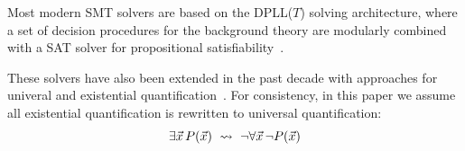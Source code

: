 \documentclass[oribibl]{llncs}
\begin{document}
Most modern SMT solvers are based on the DPLL($T$) solving architecture,
where a set of decision procedures for the background theory are modularly combined with a SAT solver for propositional satisfiability~\cite{nieuwenhuis2006solving}.

These solvers have also been extended 
in the past decade with approaches for univeral and existential quantification~\cite{Detlefs03simplify:a,MouraBjoerner07,GeBarrettTinelli07}.
For consistency, in this paper we assume all existential quantification is rewritten to universal quantification:
\[
\exists \vec x\, P( \vec x ) \ \leadsto \  \neg \forall \vec x\, \neg P( \vec x )
\]
\end{document}
